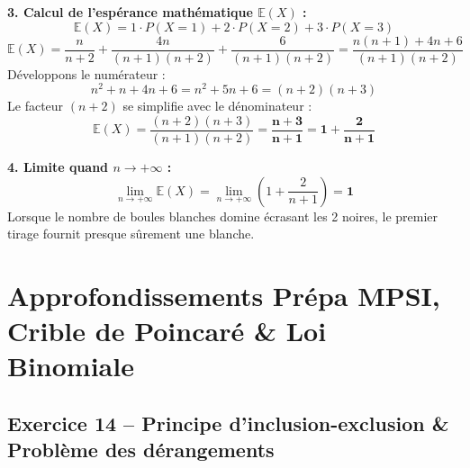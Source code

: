 \documentclass[11pt,a4paper]{article}
\newcommand{\E}{\mathbb{E}}
\begin{document}
\begin{correctionbox}
\textbf{3. Calcul de l'espérance mathématique $\E(X)$ :}
\[
\E(X) = 1 \cdot P(X = 1) + 2 \cdot P(X = 2) + 3 \cdot P(X = 3)
\]
\[
\E(X) = \frac{n}{n + 2} + \frac{4n}{(n + 1)(n + 2)} + \frac{6}{(n + 1)(n + 2)} = \frac{n(n + 1) + 4n + 6}{(n + 1)(n + 2)}
\]
Développons le numérateur :
\[
n^2 + n + 4n + 6 = n^2 + 5n + 6 = (n + 2)(n + 3)
\]
Le facteur $(n + 2)$ se simplifie avec le dénominateur :
\[
\E(X) = \frac{(n + 2)(n + 3)}{(n + 1)(n + 2)} = \mathbf{\frac{n + 3}{n + 1} = 1 + \frac{2}{n + 1}}
\]

\textbf{4. Limite quand $n \to +\infty$ :}
\[
\lim_{n \to +\infty} \E(X) = \lim_{n \to +\infty} \left( 1 + \frac{2}{n + 1} \right) = \mathbf{1}
\]
Lorsque le nombre de boules blanches domine écrasant les 2 noires, le premier tirage fournit presque sûrement une blanche.
\end{correctionbox}

\vspace{0.4cm}

\section{Approfondissements Prépa MPSI, Crible de Poincaré \& Loi Binomiale}

\subsection*{Exercice 14 -- Principe d'inclusion-exclusion \& Problème des dérangements}
\end{document}

